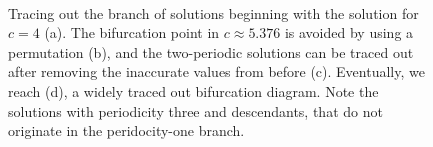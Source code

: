 \begin{figure}[!ht]
	\centering
	\quad
	\\
	\quad
	\caption{Tracing out the branch of solutions beginning with the solution for
	$c=4$ (a). The bifurcation point in $c \approx 5.376$ is avoided by using a permutation (b),
	and the two-periodic solutions can be traced out after removing the inaccurate values
	from before (c). Eventually, we reach (d), a widely traced out bifurcation diagram.
	Note the solutions with periodicity three and descendants, that do not originate in
	the peridocity-one branch.}
\end{figure}

